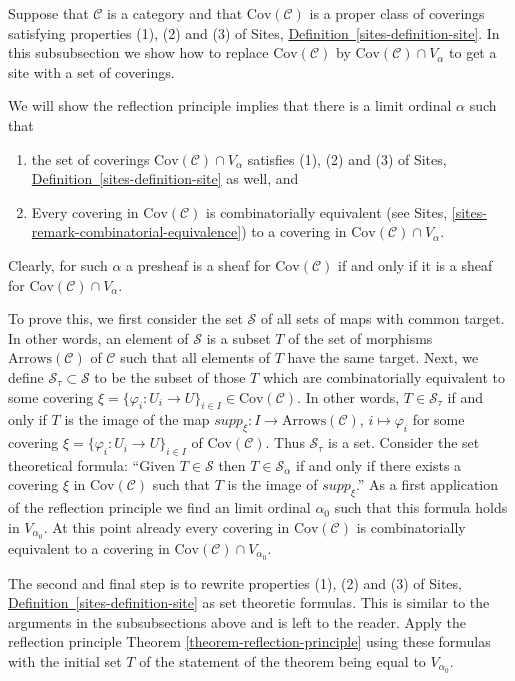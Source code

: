 \noindent
Suppose that $\mathcal{C}$ is a category and
that $\text{Cov}(\mathcal{C})$ is a proper class of coverings
satisfying properties (1), (2) and (3) of Sites,
\hyperref[sites-definition-site]%
{Definition~\ref*{sites-definition-site}}.
In this subsubsection we show how to replace $\text{Cov}(\mathcal{C})$
by $\text{Cov}(\mathcal{C}) \cap V_\alpha$ to get a site
with a set of coverings.

\medskip\noindent
We will show the reflection principle implies that there is a limit ordinal
$\alpha$ such that
\begin{enumerate}
\item the set of coverings
$\text{Cov}(\mathcal{C}) \cap V_\alpha$ satisfies
(1), (2) and (3) of Sites, \hyperref[sites-definition-site]%
{Definition~\ref*{sites-definition-site}} as well, and
\item Every covering in $\text{Cov}(\mathcal{C})$
is combinatorially equivalent (see
Sites, \autoref{sites-remark-combinatorial-equivalence})
to a covering in $\text{Cov}(\mathcal{C}) \cap V_\alpha$.
\end{enumerate}
Clearly, for such $\alpha$ a presheaf is a sheaf for $\text{Cov}(\mathcal{C})$
if and only if it is a sheaf for $\text{Cov}(\mathcal{C}) \cap V_\alpha$.

\medskip\noindent
To prove this, we first consider the set $\mathcal{S}$ of all sets of maps
with common target. In other words, an element of
$\mathcal{S}$ is a subset $T$ of the set of morphisms 
$\text{Arrows}(\mathcal{C})$ of $\mathcal{C}$ such that all
elements of $T$ have the same target. Next, we define
$\mathcal{S}_\tau \subset \mathcal{S}$ to be the subset of those
$T$ which are combinatorially equivalent to some covering
$\xi = \{\varphi_i : U_i \to U\}_{i\in I} \in \text{Cov}(\mathcal{C})$.
In other words, $T \in \mathcal{S}_\tau$ if and only if $T$
is the image of the map $supp_\xi : I \to \text{Arrows}(\mathcal{C})$,
$i\mapsto \varphi_i$ for some covering
$\xi = \{\varphi_i : U_i \to U\}_{i\in I}$
of $\text{Cov}(\mathcal{C})$. Thus $\mathcal{S}_\tau$
is a set. Consider the set theoretical formula: ``Given $T \in \mathcal{S}$
then $T\in \mathcal{S}_\alpha$ if and only if there exists
a covering $\xi$ in $\text{Cov}(\mathcal{C})$ such that
$T$ is the image of $supp_\xi$.'' As a first application of the
reflection principle we find an limit ordinal $\alpha_0$ such that
this formula holds in $V_{\alpha_0}$. At this point already every
covering in $\text{Cov}(\mathcal{C})$ is combinatorially equivalent
to a covering in $\text{Cov}(\mathcal{C}) \cap V_{\alpha_0}$.

\medskip\noindent
The second and final step is to rewrite
properties (1), (2) and (3) of Sites, \hyperref[sites-definition-site]%
{Definition~\ref*{sites-definition-site}} as set theoretic formulas.
This is similar to the arguments in the subsubsections above and is
left to the reader. Apply the reflection
principle Theorem \ref{theorem-reflection-principle} using these formulas
with the initial set $T$ of the statement of the theorem being equal to
$V_{\alpha_0}$.








